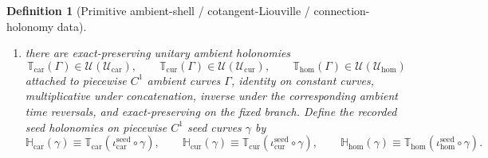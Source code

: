 \documentclass[11pt]{article}
\newcommand{\RootTensorClass}{\mathscr U_{\mathrm{car}}}
\newcommand{\RootRelabelClass}{\mathscr U_{\mathrm{cur}}}
\newcommand{\RootFreeClass}{\mathscr U_{\mathrm{hom}}}
\newcommand{\TensorSeedLiouville}{\boldsymbol{\alpha}_{\mathrm{car}}}
\newcommand{\CurSeedLiouville}{\boldsymbol{\alpha}_{\mathrm{cur}}}
\newcommand{\HomSeedLiouville}{\boldsymbol{\alpha}_{\mathrm{hom}}}
\newcommand{\TensorSeedSymplectic}{\boldsymbol{\Omega}_{\mathrm{car}}}
\newcommand{\CurSeedSymplectic}{\boldsymbol{\Omega}_{\mathrm{cur}}}
\newcommand{\HomSeedSymplectic}{\boldsymbol{\Omega}_{\mathrm{hom}}}
\newcommand{\TensorSeedTransport}{\mathbb H_{\mathrm{car}}}
\newcommand{\CurSeedTransport}{\mathbb H_{\mathrm{cur}}}
\newcommand{\HomSeedTransport}{\mathbb H_{\mathrm{hom}}}
\newcommand{\HomAmbientTimeRev}{\rho_{\mathrm{hom}}^{\mathrm{amb}}}
\newcommand{\TensorSeedInc}{\iota_{\mathrm{car}}^{\mathrm{seed}}}
\newcommand{\CurSeedInc}{\iota_{\mathrm{cur}}^{\mathrm{seed}}}
\newcommand{\HomSeedInc}{\iota_{\mathrm{hom}}^{\mathrm{seed}}}
\newcommand{\TensorAmbientLiouville}{\boldsymbol{\Lambda}_{\mathrm{car}}}
\newcommand{\CurAmbientLiouville}{\boldsymbol{\Lambda}_{\mathrm{cur}}}
\newcommand{\HomAmbientLiouville}{\boldsymbol{\Lambda}_{\mathrm{hom}}}
\newcommand{\TensorAmbientTwo}{\boldsymbol{\Xi}_{\mathrm{car}}}
\newcommand{\CurAmbientTwo}{\boldsymbol{\Xi}_{\mathrm{cur}}}
\newcommand{\HomAmbientTwo}{\boldsymbol{\Xi}_{\mathrm{hom}}}
\newcommand{\TensorAmbientTransport}{\mathbb T_{\mathrm{car}}}
\newcommand{\CurAmbientTransport}{\mathbb T_{\mathrm{cur}}}
\newcommand{\HomAmbientTransport}{\mathbb T_{\mathrm{hom}}}
\newtheorem{definition}{Definition}
\begin{document}
\begin{definition}[Primitive ambient-shell / cotangent-Liouville / connection-holonomy data]
\begin{enumerate}
\[    (\HomAmbientTimeRev)^*\HomAmbientLiouville=-\HomAmbientLiouville.
    \]
    Define the recorded seed Liouville one-forms and seed closed two-forms by shell restriction:
    \begin{equation}
    \TensorSeedLiouville\equiv(\TensorSeedInc)^*\TensorAmbientLiouville,\qquad
    \CurSeedLiouville\equiv(\CurSeedInc)^*\CurAmbientLiouville,\qquad
    \HomSeedLiouville\equiv(\HomSeedInc)^*\HomAmbientLiouville,
    \label{eq:seed_liouville_from_ambient}
    \end{equation}
    \begin{equation}
    \TensorSeedSymplectic\equiv(\TensorSeedInc)^*\TensorAmbientTwo,\qquad
    \CurSeedSymplectic\equiv(\CurSeedInc)^*\CurAmbientTwo,\qquad
    \HomSeedSymplectic\equiv(\HomSeedInc)^*\HomAmbientTwo.
    \label{eq:seed_two_from_ambient}
    \end{equation}
    \item there are exact-preserving unitary ambient holonomies
    \[
    \TensorAmbientTransport(\Gamma)\in\mathcal U(\RootTensorClass),\qquad
    \CurAmbientTransport(\Gamma)\in\mathcal U(\RootRelabelClass),\qquad
    \HomAmbientTransport(\Gamma)\in\mathcal U(\RootFreeClass)
    \]
    attached to piecewise \(C^1\) ambient curves \(\Gamma\), identity on constant curves, multiplicative under concatenation, inverse under the corresponding ambient time reversals, and exact-preserving on the fixed branch. Define the recorded seed holonomies on piecewise \(C^1\) seed curves \(\gamma\) by
    \begin{equation}
    \TensorSeedTransport(\gamma)\equiv\TensorAmbientTransport(\TensorSeedInc\circ\gamma),\qquad
    \CurSeedTransport(\gamma)\equiv\CurAmbientTransport(\CurSeedInc\circ\gamma),\qquad
    \HomSeedTransport(\gamma)\equiv\HomAmbientTransport(\HomSeedInc\circ\gamma).
    \label{eq:seed_transport_from_ambient}
    \end{equation}
\end{enumerate}


\end{definition}
\end{document}
